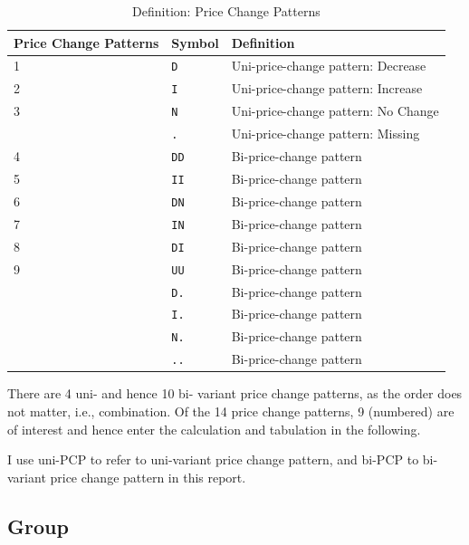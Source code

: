 \begin{table}[H]
	\caption{Definition: Price Change Patterns}
	\begin{tabular}{lll}
		\hline\hline
		Price Change Patterns &   Symbol    & Definition                          \\ \hline\hline
		1                     & \texttt{D } & Uni-price-change pattern: Decrease  \\
		2                     & \texttt{I } & Uni-price-change pattern: Increase  \\
		3                     & \texttt{N } & Uni-price-change pattern: No Change \\ \hline
		& \texttt{. } & Uni-price-change pattern: Missing   \\ \hline\hline
		4                     & \texttt{DD} & Bi-price-change pattern             \\
		5                     & \texttt{II} & Bi-price-change pattern             \\
		6                     & \texttt{DN} & Bi-price-change pattern             \\
		7                     & \texttt{IN} & Bi-price-change pattern             \\
		8                     & \texttt{DI} & Bi-price-change pattern             \\
		9                     & \texttt{UU} & Bi-price-change pattern             \\ \hline
		& \texttt{D.} & Bi-price-change pattern             \\
		& \texttt{I.} & Bi-price-change pattern             \\
		& \texttt{N.} & Bi-price-change pattern             \\
		& \texttt{..} & Bi-price-change pattern             \\ \hline\hline
	\end{tabular}
\end{table}

There are 4 uni- and hence 10 bi- variant price change patterns, as the order does not matter, i.e., combination. Of the 14 price change patterns, 9 (numbered) are of interest and hence enter the calculation and tabulation in the following.

I use uni-PCP to refer to uni-variant price change pattern, and bi-PCP to bi-variant price change pattern in this report.

\subsection{Group}

